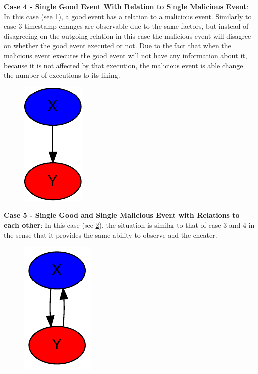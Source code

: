 	\newpar \textbf{Case 4 - Single Good Event With Relation to Single Malicious Event}: In this case (see \ref{fig:consensus:single-good-with-malicious-relation}), a good event has a relation to a malicious event. Similarly to case 3 timestamp changes are observable due to the same factors, but instead of disagreeing on the outgoing relation in this case the malicious event will disagree on whether the good event executed or not. Due to the fact that when the malicious event executes the good event will not have any information about it, because it is not affected by that execution, the malicious event is able change the number of executions to its liking.
	 
	\begin{figure}[H]
		\centering
		\includegraphics[]{5validation/images/2.pdf}
		\caption{}
		\label{fig:consensus:single-good-with-malicious-relation}
	\end{figure}
	
	\newpar \textbf{Case 5 - Single Good and Single Malicious Event with Relations to each other}: In this case (see \ref{fig:consensus:single-good-with-twoway-malicious-relation}), the situation is similar to that of case 3 and 4 in the sense that it provides the same ability to observe and the cheater.
	
	\begin{figure}[H]
		\centering
		\includegraphics[]{5validation/images/6.pdf}
		\caption{}
		\label{fig:consensus:single-good-with-twoway-malicious-relation}
	\end{figure}
	

